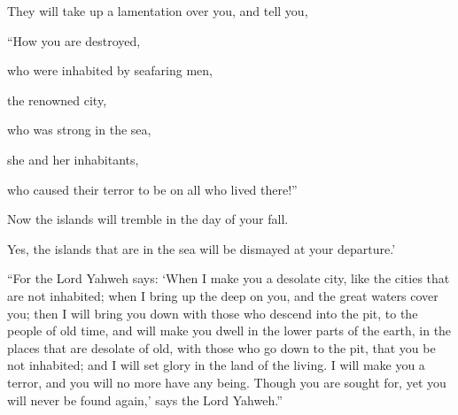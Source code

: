 {They will take up a lamentation over you, and tell you,
\par }{\Q “How you are destroyed,
\par }{\QB who were inhabited by seafaring men,
\par }{\Q the renowned city,
\par }{\QB who was strong in the sea,
\par }{\Q she and her inhabitants,
\par }{\QB who caused their terror to be on all who lived there!”
\par }{\Q {}Now the islands will tremble in the day of your fall.
\par }{\QB Yes, the islands that are in the sea will be dismayed at your departure.’
\par }{\PP {}“For the Lord Yahweh says: ‘When I make you a desolate city, like the cities that are not inhabited; when I bring up the deep on you, and the great waters cover you;
then I will bring you down with those who descend into the pit, to the people of old time, and will make you dwell in the lower parts of the earth, in the places that are desolate of old, with those who go down to the pit, that you be not inhabited; and I will set glory in the land of the living.
I will make you a terror, and you will no more have any being. Though you are sought for, yet you will never be found again,’ says the Lord Yahweh.”

}

